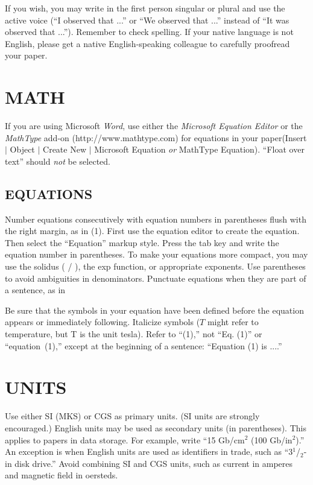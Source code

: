 \documentclass{IEEEjmw}
\begin{document}
If you wish, you may write in the first person singular or plural and use the active voice (``I observed that ...'' or ``We observed that ...'' instead of ``It was observed that ...''). Remember to check spelling. If your native language is not English, please get a native English-speaking colleague to carefully proofread your paper.

\section{MATH}

If you are using Microsoft {\it Word}, use either the {\it Microsoft Equation Editor} or the {\it MathType} add-on (http://www.mathtype.com) for equations in your paper\break (Insert $|$ Object $|$ Create New $|$ Microsoft Equation {\it or} MathType Equation). ``Float over text'' should {\it not} be selected.

\subsection{EQUATIONS}

Number equations consecutively with equation numbers in parentheses flush with the right margin, as in (1). First use the equation editor to create the equation. Then select the ``Equation'' markup style. Press the tab key and write the equation number in parentheses. To make your equations more compact, you may use the solidus ( / ), the exp function, or appropriate exponents. Use parentheses to avoid ambiguities in denominators. Punctuate equations when they are part of a sentence, as in
\begin{equation}
\!
\end{equation}

Be sure that the symbols in your equation have been defined before the equation appears or immediately following. Italicize symbols ($T$ might refer to temperature, but T is the unit tesla). Refer to ``(1),'' not ``Eq. (1)'' or ``equation~(1),'' except at the beginning of a sentence: ``Equation (1) is ....''


\section{UNITS}

Use either SI (MKS) or CGS as primary units. (SI units are strongly encouraged.) English units may be used as secondary units (in parentheses). This applies to papers in data storage. For example, write ``15 Gb/cm$^2$ (100 Gb/in$^2$).'' An exception is when English units are used as identifiers in trade, such as ``3$^1${/}$_2$-in disk drive.'' Avoid combining SI and CGS units, such as current in amperes and magnetic field in oersteds. %
\end{document}
